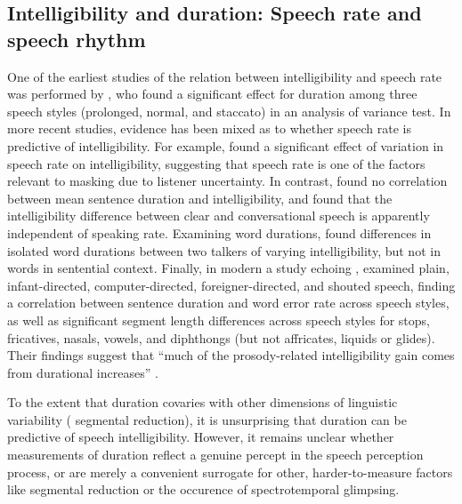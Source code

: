 \subsection[Intelligibility and duration]{Intelligibility and duration: Speech rate and speech rhythm\label{sec:IntelDur}}
One of the earliest studies of the relation between intelligibility and speech rate was performed by \citet{Tolhurst1957a}, who found a significant effect for duration among three speech styles (prolonged, normal, and staccato) in an analysis of variance test.  In more recent studies, evidence has been mixed as to whether speech rate is predictive of intelligibility.  For example, \citet{SommersEtAl1994} found a significant effect of variation in speech rate on intelligibility, suggesting that speech rate is one of the factors relevant to masking due to listener uncertainty.  In contrast, \citet{BradlowEtAl1996} found no correlation between mean sentence duration and intelligibility, and \citet{KrauseBraida2002} found that the intelligibility difference between clear and conversational speech is apparently independent of speaking rate.  Examining word durations, \citet{BondMoore1994} found differences in isolated word durations between two talkers of varying intelligibility, but not in words in sentential context.  Finally, in modern a study echoing \citet{Tolhurst1957a}, \citet{MayoEtAl2012} examined plain, infant-directed, computer-directed, foreigner-directed, and shouted speech, finding a correlation between sentence duration and word error rate across speech styles, as well as significant segment length differences across speech styles for stops, fricatives, nasals, vowels, and diphthongs (but not affricates, liquids or glides).  Their findings suggest that “much of the prosody-related intelligibility gain comes from durational increases” \citep{MayoEtAl2012}.

To the extent that duration covaries with other dimensions of linguistic variability (\eg{} segmental reduction), it is unsurprising that duration can be predictive of speech intelligibility.  However, it remains unclear whether measurements of duration reflect a genuine percept in the speech perception process, or are merely a convenient surrogate for other, harder-to-measure factors like segmental reduction or the occurence of spectrotemporal glimpsing.

